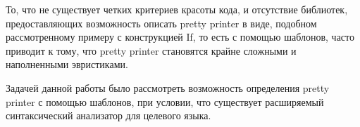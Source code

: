 То, что не существует четких критериев красоты кода, и отсутствие библиотек, предоставляющих возможность описать pretty printer в виде, подобном
рассмотренному примеру с конструкцией If, то есть с помощью шаблонов, часто приводит к тому, что pretty printer становятся крайне сложными и наполненными эвристиками.

Задачей данной работы было рассмотреть возможность определения pretty printer с помощью шаблонов, при условии, что существует расширяемый синтаксический анализатор для целевого языка.
